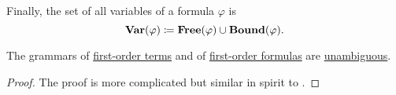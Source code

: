\begin{definition}
\begin{thmenum}
     Finally, the set of all variables of a formula \( \varphi \) is
    \begin{equation}\label{eq:def:first_order_syntax/formula_variables}
      \operatorname{\mathbf{Var}}(\varphi) \coloneqq \operatorname{\mathbf{Free}}(\varphi) \cup \operatorname{\mathbf{Bound}}(\varphi).
    \end{equation}
  \end{thmenum}
\end{definition}

\begin{proposition}\label{thm:first_order_terms_and_formulas_are_unambiguous}
  The grammars of \hyperref[def:first_order_syntax/term]{first-order terms} and of \hyperref[def:first_order_syntax/formula]{first-order formulas} are \hyperref[def:grammar_derivation/ambiguity]{unambiguous}.
\end{proposition}
\begin{proof}
  The proof is more complicated but similar in spirit to .
\end{proof}

